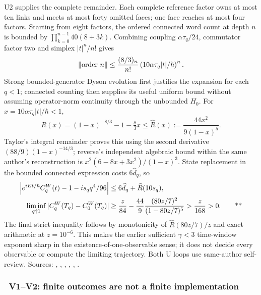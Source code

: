 U2 supplies the complete remainder.  Each complete reference factor owns at
most ten links and meets at most forty omitted faces; one face reaches at most
four factors.  Starting from eight factors, the ordered connected word count
at depth $n$ is bounded by $\prod_{k=0}^{n-1}40(8+3k)$.  Combining coupling
$\alpha\tau_q/24$, commutator factor two and simplex $|t|^n/n!$ gives
\begin{equation}
 \left\lVert \text{order }n\right\rVert\le\frac{(8/3)_n}{n!}
 \left(10\alpha\tau_q|t|/\hbar\right)^n.
 \label{recent:u-connected}
\end{equation}
Strong bounded-generator Dyson evolution first justifies the expansion for each
$q<1$; connected counting then supplies its useful uniform bound without
assuming operator-norm continuity through the unbounded $H_0$.
For $x=10\alpha\tau_q|t|/\hbar<1$,
\begin{equation}
 R(x)=(1-x)^{-8/3}-1-\tfrac83x
 \le\widehat R(x):=\frac{44x^2}{9(1-x)^5}.
 \label{recent:u-tail}
\end{equation}
Taylor's integral remainder proves this using the second derivative
$(88/9)(1-x)^{-14/3}$; reverse's independent algebraic bound within the same
author's reconstruction is $x^2(6-8x+3x^2)/(1-x)^3$.
State replacement in the bounded connected expression costs $6\widehat d_q$,
so
\begin{align}
 \left|e^{iEt/\hbar}C_q^W(t)-1-is_qq^4/96\right|
 &\le6\widehat d_q+\widehat R(10s_q),\notag\\
 \liminf_{q\uparrow1}|C_q^W(T_q)-C_0^W(T_q)|
 &\ge\frac z{84}-\frac{44}{9}
 \frac{(80z/7)^2}{(1-80z/7)^5}>\frac z{168}>0.
 \qquad\text{**}
 \label{recent:u-endpoint}
\end{align}
The final strict inequality follows by monotonicity of $\widehat R(80z/7)/z$
and exact arithmetic at $z=10^{-6}$.  This makes the earlier sufficient
$\gamma<3$ time-window exponent sharp in the existence-of-one-observable sense;
it does not decide every observable or compute the limiting trajectory.
Both U loops use same-author self-review.
Sources: ,
,
,
,
,
.

\subsubsection{\workstar\ V1--V2: finite outcomes are not a finite implementation}

